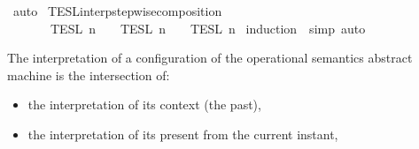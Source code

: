 \begin{isabellebody}
%
\isadelimproof
%
\endisadelimproof
%
\isatagproof
{}\isamarkupfalse%
\ auto%
\endisatagproof
{\isafoldproof}%
%
\isadelimproof
\isanewline
%
\endisadelimproof
\isanewline
{}\isamarkupfalse%
\ TESL{\isacharunderscore}interp{\isacharunderscore}stepwise{\isacharunderscore}composition{\isacharcolon}\isanewline
\ \ \ {\isacartoucheopen}{\isasymlbrakk}{\isasymlbrakk}\ {\isasymPhi}\ {\isacharat}\ {\isasymPhi}\ {\isasymrbrakk}{\isasymrbrakk}\isactrlsub T\isactrlsub E\isactrlsub S\isactrlsub L\isactrlbsup {\isasymge}\ n\isactrlesup \ {\isacharequal}\ {\isasymlbrakk}{\isasymlbrakk}\ {\isasymPhi}\ {\isasymrbrakk}{\isasymrbrakk}\isactrlsub T\isactrlsub E\isactrlsub S\isactrlsub L\isactrlbsup {\isasymge}\ n\isactrlesup \ {\isasyminter}\ {\isasymlbrakk}{\isasymlbrakk}\ {\isasymPhi}\ {\isasymrbrakk}{\isasymrbrakk}\isactrlsub T\isactrlsub E\isactrlsub S\isactrlsub L\isactrlbsup {\isasymge}\ n\isactrlesup {\isacartoucheclose}\isanewline
%
\isadelimproof
%
\endisadelimproof
%
\isatagproof
{}\isamarkupfalse%
\ {\isacharparenleft}induction\ {\isasymPhi}\ simp{\isacharcomma}\ auto{\isacharparenright}%
\endisatagproof
{\isafoldproof}%
%
\isadelimproof
%
\endisadelimproof
%
\isadelimdocument
%
\endisadelimdocument
%
\isatagdocument
%
\isamarkuptrue%
%
\endisatagdocument
{\isafolddocument}%
%
\isadelimdocument
%
\endisadelimdocument
%
\begin{isamarkuptext}%
The interpretation of a configuration of the operational semantics abstract 
machine is the intersection of:

%
\begin{itemize}%
\item the interpretation of its context (the past),

\item the interpretation of its present from the current instant,


\end{itemize}
\end{isamarkuptext}
\end{isabellebody}
